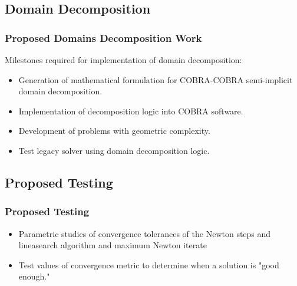 \documentclass[compress,xcolor=table]{beamer}
\begin{document}
\subsection[Domain Decomposition]{Domain Decomposition}
\begin{frame}
\frametitle{Proposed Domains Decomposition Work}

Milestones required for implementation of domain decomposition:

\begin{itemize}
\item{Generation of mathematical formulation for COBRA-COBRA semi-implicit domain decomposition.}
\item{Implementation of decomposition logic into COBRA software.}
\item{Development of problems with geometric complexity.}
\item{Test legacy solver using domain decomposition logic.} 
\end{itemize}

\end{frame}
\subsection[Testing]{Proposed Testing}
\begin{frame}
\frametitle{Proposed Testing}

\begin{itemize}
\item{Parametric studies of convergence tolerances of the Newton steps and lineasearch algorithm and maximum Newton iterate}
\item{Test values of convergence metric to determine when a solution is "good enough."}
\end{itemize}

\end{frame}
\end{document}
